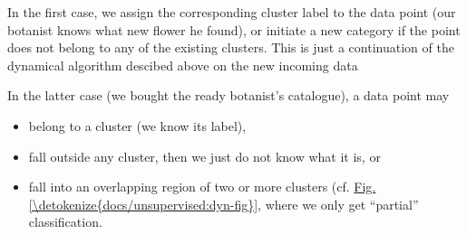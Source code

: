 \documentclass[letterpaper,10pt,english]{jupyterBook}
\begin{document}
\sphinxAtStartPar
In the first case, we assign the corresponding cluster label to the data point (our botanist knows what new flower he found), or initiate a new category if the point does not belong to any of the existing clusters. This is just a continuation of the dynamical algorithm descibed above on the new incoming data

\sphinxAtStartPar
In the latter case (we bought the ready botanist’s catalogue), a data point may
\begin{itemize}
\item {} 
\sphinxAtStartPar
belong to a cluster (we know its label),

\item {} 
\sphinxAtStartPar
fall outside any cluster, then we just do not know what it is, or

\item {} 
\sphinxAtStartPar
fall into an overlapping region of two or more clusters (cf. \hyperref[\detokenize{docs/unsupervised:dyn-fig}]{Fig.\@ \ref{\detokenize{docs/unsupervised:dyn-fig}}}, where we only get “partial” classification.

\end{itemize}
\end{document}
